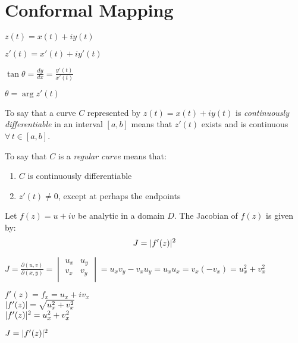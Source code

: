 \documentclass[letterpaper,12pt,fleqn]{article}
\renewcommand{\o}{\theta}
\begin{document}
\section*{Conformal Mapping}

\begin{minipage}{3in}
\end{minipage}
\begin{minipage}{3in}
  $z(t)=x(t)+iy(t)$
  
  $z'(t)=x'(t)+iy'(t)$

  $\tan{\o}=\frac{dy}{dx}=\frac{y'(t)}{x'(t)}$

  $\o=\arg{z'(t)}$
\end{minipage}

\begin{definition}
  To say that a curve $C$ represented by $z(t)=x(t)+iy(t)$ is
  \emph{continuously differentiable} in an interval $[a,b]$ means that $z'(t)$
  exists and is continuous $\forall\,t\in[a,b]$.

  To say that $C$ is a \emph{regular curve} means that:
  \begin{enumerate}
  \item $C$ is continuously differentiable
  \item $z'(t)\ne0$, except at perhaps the endpoints
  \end{enumerate}
\end{definition}

\begin{theorem}
  Let $f(z)=u+iv$ be analytic in a domain $D$. The Jacobian of $f(z)$ is
  given by:
  \[J=\lvert f'(z)\rvert^2\]
\end{theorem}

\begin{theproof}
  $J=\frac{\partial(u,v)}{\partial(x,y)}=
  \begin{vmatrix}
    u_x & u_y \\
    v_x & v_y \\
  \end{vmatrix}=u_xv_y-v_xu_y=u_xu_x=v_x(-v_x)=u_x^2+v_x^2$

  $f'(z)=f_x=u_x+iv_x$ \\
  $\lvert f'(z)\rvert=\sqrt{u_x^2+v_x^2}$ \\
  $\lvert f'(z)\rvert^2=u_x^2+v_x^2$

  $J=\lvert f'(z)\rvert^2$
\end{theproof}
\end{document}

